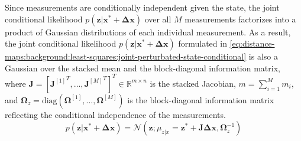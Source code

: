 Since measurements are conditionally independent given the state,
the joint conditional likelihood
$p(\mathbf{z}|\mathbf{x}^*+\mathbf{\Delta x})$ over all $M$ measurements
factorizes into a product of Gaussian distributions of
each individual measurement. As a result, the joint conditional likelihood
$p(\mathbf{z}|\mathbf{x}^* + \mathbf{\Delta x})$ formulated in
\eqref{eq:distance-maps:background:least-squares:joint-perturbated-state-conditional}
is also a Gaussian over the stacked mean and the block-diagonal information
matrix, where
$\mathbf{J} = \left[{\mathbf{J}^{[1]}}^T, \ldots, {\mathbf{J}^{[M]}}^T\right]^T\in \mathbb{R}^{m \times n}$
is the stacked Jacobian, $m = \sum_{i=1}^{M} m_i$, and
$\mathbf{\Omega}_z = \mathrm{diag}\!\left(\mathbf{\Omega}^{[1]}, \ldots, \mathbf{\Omega}^{[M]}\right)$
is the block-diagonal information matrix reflecting the conditional independence
of the measurements.
\begin{equation}
\label{eq:distance-maps:background:least-squares:joint-perturbated-state-conditional}
p(\mathbf{z}|\mathbf{x}^* + \mathbf{\Delta x})
= \mathcal{N}\!\left(\mathbf{z};
    \mu_{z|x} = \mathbf{z}^* + \mathbf{J} \mathbf{\Delta x},
    \mathbf{\Omega}_z^{-1}
  \right)
\end{equation}

